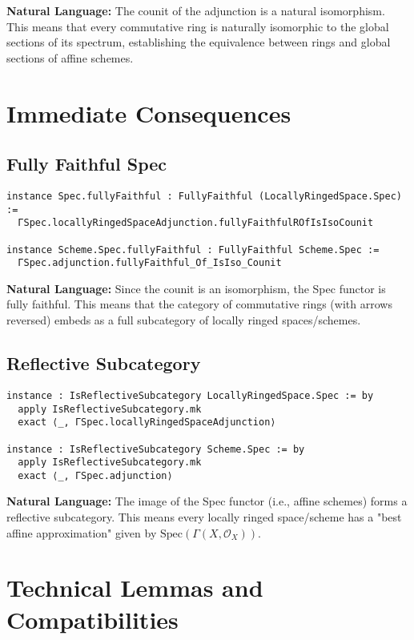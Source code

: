 \documentclass{article}
\theoremstyle{definition}
\begin{document}
\textbf{Natural Language:} The counit of the adjunction is a natural isomorphism. This means that every commutative ring is naturally isomorphic to the global sections of its spectrum, establishing the equivalence between rings and global sections of affine schemes.

\section{Immediate Consequences}

\subsection{Fully Faithful Spec}

\begin{lstlisting}
instance Spec.fullyFaithful : FullyFaithful (LocallyRingedSpace.Spec) :=
  ΓSpec.locallyRingedSpaceAdjunction.fullyFaithfulROfIsIsoCounit

instance Scheme.Spec.fullyFaithful : FullyFaithful Scheme.Spec :=
  ΓSpec.adjunction.fullyFaithful_Of_IsIso_Counit
\end{lstlisting}

\textbf{Natural Language:} Since the counit is an isomorphism, the Spec functor is fully faithful. This means that the category of commutative rings (with arrows reversed) embeds as a full subcategory of locally ringed spaces/schemes.

\subsection{Reflective Subcategory}

\begin{lstlisting}
instance : IsReflectiveSubcategory LocallyRingedSpace.Spec := by
  apply IsReflectiveSubcategory.mk
  exact ⟨_, ΓSpec.locallyRingedSpaceAdjunction⟩
  
instance : IsReflectiveSubcategory Scheme.Spec := by
  apply IsReflectiveSubcategory.mk  
  exact ⟨_, ΓSpec.adjunction⟩
\end{lstlisting}

\textbf{Natural Language:} The image of the Spec functor (i.e., affine schemes) forms a reflective subcategory. This means every locally ringed space/scheme has a "best affine approximation" given by $\mathrm{Spec}(\Gamma(X, \mathcal{O}_X))$.

\section{Technical Lemmas and Compatibilities}
\end{document}

